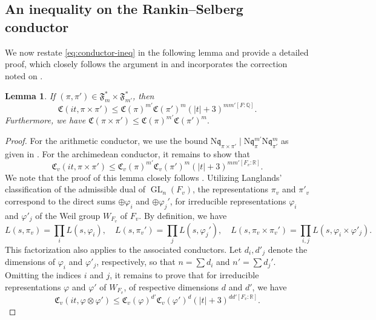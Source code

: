 \documentclass[12pt,reqno]{amsart}
\newtheorem{lem}[thm]{Lemma}
\theoremstyle{remark}
\DeclareMathOperator{\GL}{GL}
\newcommand{\N}{\mathrm{N}}
\newcommand{\Q}{\mathbb{Q}}
\newcommand{\kq}{\mathfrak{q}}
\numberwithin{equation}{section}
\begin{document}
\begin{appendices}
\section{An inequality on the Rankin--Selberg conductor}
    We now restate \eqref{eq:conductor-ineq} in the following lemma and provide a detailed proof, which closely follows the argument in \cite[Theorem A.2]{Humphries-Brumley} and incorporates the correction noted on \cite[P. 9]{Ramakrishnan-Yang}.
    \begin{lem}\label{lem:brumley}
        If $(\pi,\pi')\in\mathfrak{F}_{m}^*\times\mathfrak{F}_{m'}^*$, then
        \[
        \mathfrak{C}(it, \pi\times \pi') \le  \mathfrak{C}(\pi)^{m'}\mathfrak{C}(\pi')^m(|t|+3)^{mm'[F:\Q]}.
        \]
    Furthermore, we have $\mathfrak{C}(\pi \times \pi') \le \mathfrak{C}(\pi)^{m'}\mathfrak{C}(\pi')^{m}.$  
    \end{lem}
    \begin{proof}
	For the arithmetic conductor, we use the bound $\N\kq_{\pi\times{\pi'}}\mid \N\kq_{\pi}^{m'}\N\kq_{{\pi'}}^{m}$ as given in \cite[Theorem 2]{BushHen}. For the archimedean conductor,  it remains to show that
    \[
    \mathfrak{C}_{v}(it, \pi \times \pi') \le \mathfrak{C}_{v}( \pi )^{m'}\mathfrak{C}_{v}( \pi')^{m}(|t|+3)^{mm'[F_{v}:\mathbb{R}]}.
     \]
    We note that the proof of this lemma closely follows \cite[Theorem A.2]{Humphries-Brumley}. Utilizing Langlands' classification of the admissible dual of $\GL_{n}(F_v)$,  the representations $\pi_v$ and $\pi'_v$ correspond to the direct sums $\oplus \varphi_i$ and $\oplus\varphi_j'$, for irreducible representations $\varphi_i$ and $\varphi'_j$ of the Weil group $W_{F_v}$ of $F_v$. By definition, we have 
     \[
     L(s,\pi_v) = \prod_i L(s, \varphi_i), \quad L(s,\pi_v') = \prod_j L(s, \varphi_j'), \quad L(s,\pi_v \times \pi_v') = \prod_{i,j} L(s, \varphi_i \times \varphi'_j).
     \]
     This factorization also applies to the associated conductors.   Let $d_i, d'_j$ denote the dimensions of $\varphi_i$ and $\varphi'_j$, respectively, so that $n = \sum d_i$ and $n' = \sum d_j'$. Omitting the indices $i$ and $j$, it remains to prove that for irreducible representations $\varphi$ and $\varphi'$ of $W_{F_v}$, of respective dimensions $d$ and $d'$, we have 
   \begin{equation}\label{eq:goal-archimedean}
       \mathfrak{C}_{v}(it, \varphi \otimes \varphi') \le \mathfrak{C}_{v}(\varphi )^{d'}\mathfrak{C}_{v}(  \varphi')^{d}(|t|+3)^{dd'[F_{v}:\mathbb{R}]}.
   \end{equation}


\end{proof}
\end{appendices}
\end{document}
